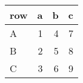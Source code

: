 \begin{tabular}{lrrr}
  \toprule
 row & a & b & c \\ 
  \midrule
  A &   1 &   4 &   7 \\ 
  B &   2 &   5 &   8 \\ 
  C &   3 &   6 &   9 \\ 
   \bottomrule
\end{tabular}
